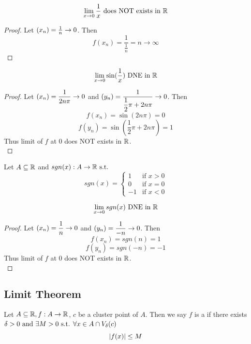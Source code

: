 \documentclass[a4paper,12pt]{article}
\begin{document}
\begin{example}
    \[\lim_{x\rightarrow 0} {\dfrac{1}{x }}\text{ does NOT exists in } \mathbb{R}\]
    \begin{proof}
        Let \((x _{n })=\frac{1 }{n }\rightarrow 0\). Then 
        \[f(x_n)=\dfrac{1}{\frac{1}{n}}=n\rightarrow\infty\]
    \end{proof}
\end{example}

\newpage
\begin{example}
    \[\lim_{x\rightarrow 0} {\sin(\frac{1}{x })} \text{ DNE in } \mathbb{R}\]
    \begin{proof}
        Let \((x _{n })=\dfrac{1 }{2n\pi}\rightarrow 0\) and \((y _{n })=\dfrac{1 }{\dfrac{1}{2}\pi + 2n\pi}\rightarrow 0\). Then 
        \[f(x_n)=\sin(2n\pi)=0\]
        \[f(y_n)=\sin(\dfrac{1}{2}\pi+2n\pi)=1\]
        Thus limit of \(f\) at \(0\) does NOT exists in \(\mathbb{R}\).\\
    \end{proof}
\end{example}

\begin{example}
    \begin{definition} Let \(A\subseteq\mathbb{R}\) and \(sgn(x):A\rightarrow\mathbb{R}\text{ s.t. }\)
        \[sgn(x)=\begin{cases}
            1 & \text{if }x>0\\
            0 & \text{if }x=0\\
            -1 & \text{if }x<0
        \end{cases}\]
    \end{definition}

    \[\lim_{x\rightarrow 0} {sgn(x)}\text{ DNE in }\mathbb{R}\]
    \begin{proof}
        Let \((x _{n })=\dfrac{1 }{n}\rightarrow 0\) and \((y _{n })=\dfrac{1 }{-n}\rightarrow 0\). Then 
        \[f(x_n)=sgn(n)=1\]
        \[f(y_n)=sgn(-n)=-1\]
        Thus limit of \(f\) at \(0\) does NOT exists in \(\mathbb{R}\).\\
    \end{proof}

\end{example}
\newpage

\subsection{Limit Theorem}

\begin{definition}
    Let \(A\subseteq\mathbb{R},f:A\rightarrow\mathbb{R}\), \(c \) be a cluster point of \(A\). 
    Then we say \(f\) is a  if 
    there exists \(\delta>0\text{ and }\exists M>0\text{ s.t. }\forall x\in A\cap V_{\delta}{(c )}\)
    \[\left\lvert f(x )\right\rvert\le M\]
\end{definition}
\end{document}
